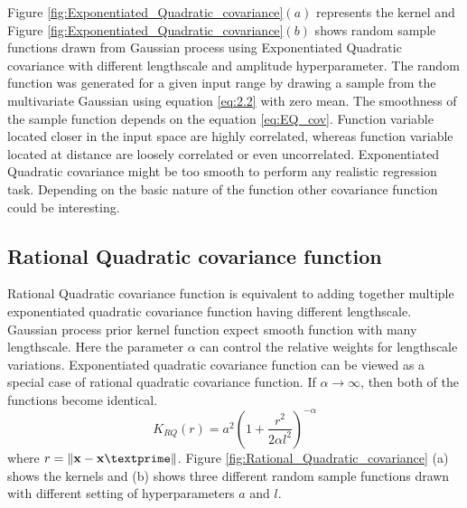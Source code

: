 Figure \ref{fig:Exponentiated_Quadratic_covariance}$(a)$ represents the kernel and 
Figure \ref{fig:Exponentiated_Quadratic_covariance}$(b)$ shows random sample 
functions drawn from Gaussian process using Exponentiated Quadratic covariance with different
lengthscale and amplitude hyperparameter. The random function was generated for a given input
range by drawing a sample from the multivariate Gaussian using equation \ref{eq:2.2} with zero mean. 
The smoothness of the sample function depends on the equation \ref{eq:EQ_cov}. Function variable
located closer in the input space are highly correlated, whereas function variable located at distance
are loosely correlated or even uncorrelated. Exponentiated Quadratic covariance might be
too smooth to perform any realistic regression task. Depending on the basic nature of the function
other covariance function could be interesting.

\subsection{Rational Quadratic covariance function}

Rational Quadratic covariance function is equivalent to adding together multiple
exponentiated quadratic covariance function having different lengthscale.
Gaussian process prior kernel function expect smooth function with many lengthscale.
Here the parameter $\alpha$ can control the relative weights for lengthscale variations.
Exponentiated quadratic covariance function can be viewed as a special case of rational quadratic 
covariance function. If $\alpha \to \infty$, then both of the functions become identical.
\begin{equation} \label{eq:RQ_cov}
K_{RQ}(r)= a^2 \left(1+ \frac{r^2}{2 \alpha l^2}\right)^{-\alpha}
\end{equation}
where $r=\lVert \textbf{x}-\textbf{x}\textprime \rVert$. 
Figure \ref{fig:Rational_Quadratic_covariance} (a) shows the kernels and (b) shows
three different random sample functions drawn with different setting of hyperparameters 
$a$ and $l$.

